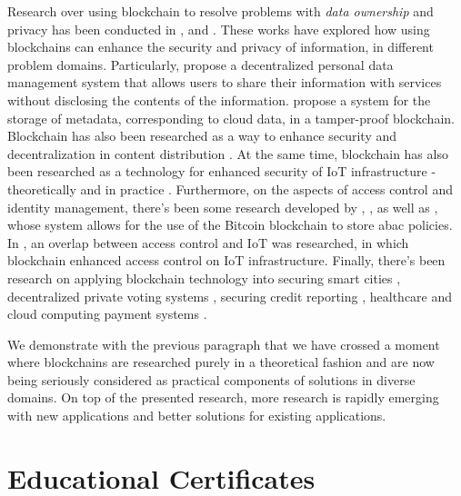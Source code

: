 Research over using blockchain to resolve problems with \textit{data ownership} and privacy has been conducted in \cite{zyskind_decentralizing_2015}, \cite{liang_provchain:_2017} and \cite{yue_healthcare_2016}. These works have explored how using blockchains can enhance the security and privacy of information, in different problem domains. Particularly, \citeauthor{zyskind_decentralizing_2015} \cite{zyskind_decentralizing_2015} propose a decentralized personal data management system that allows users to share their information with services without disclosing the contents of the information. \citeauthor{liang_provchain:_2017} \cite{liang_provchain:_2017} propose a system for the storage of metadata, corresponding to cloud data, in a tamper-proof blockchain. Blockchain has also been researched as a way to enhance security and decentralization in content distribution \cite{fotiou_decentralized_2016}. At the same time, blockchain has also been researched as a technology for enhanced security of IoT infrastructure - theoretically \cite{christidis_blockchains_2016, ouaddah_access_2017} and in practice \cite{dorri_blockchain_2017, ouaddah_fairaccess:_2017}. Furthermore, on the aspects of access control and identity management, there's been some research developed by \citeauthor{augot_identity_2017} \cite{augot_identity_2017}, \citeauthor{yasin_online_2016} \cite{yasin_online_2016}, as well as \citeauthor{maesa_blockchain_2017} \cite{maesa_blockchain_2017}, whose system allows for the use of the Bitcoin blockchain to store \gls{abac} policies. In \cite{ouaddah_fairaccess:_2017}, an overlap between access control and IoT was researched, in which blockchain enhanced access control on IoT infrastructure. Finally, there's been research on applying blockchain technology into securing smart cities \cite{biswas_securing_2016}, decentralized private voting systems \cite{sheer_hardwick_e-voting_2018}, securing credit reporting \cite{kafshdar_goharshady_secure_2018}, healthcare \cite{azaria_medrec:_2016} and cloud computing payment systems \cite{zhang_blockchain_2018}.

We demonstrate with the previous paragraph that we have crossed a moment where blockchains are researched purely in a theoretical fashion and are now being seriously considered as practical components of solutions in diverse domains. On top of the presented research, more research is rapidly emerging with new applications and better solutions for existing applications.

\section{Educational Certificates}
\label{sec:related-ec}

